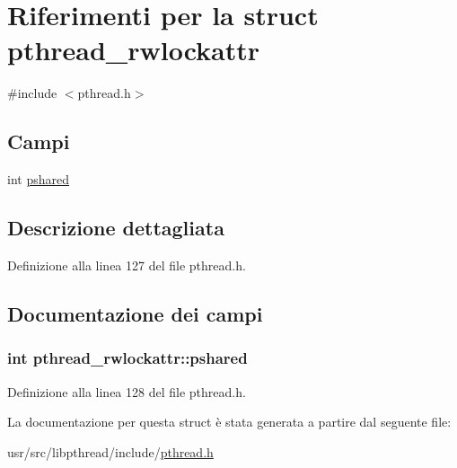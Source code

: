 \hypertarget{structpthread__rwlockattr}{\section{Riferimenti per la struct pthread\+\_\+rwlockattr}
\label{structpthread__rwlockattr}
}


{\ttfamily \#include $<$pthread.\+h$>$}

\subsection*{Campi}
\begin{DoxyCompactItemize}
\item 
int \hyperlink{structpthread__rwlockattr_a8a113eba0407c92f6302fada4c4d7419}{pshared}
\end{DoxyCompactItemize}


\subsection{Descrizione dettagliata}


Definizione alla linea 127 del file pthread.\+h.



\subsection{Documentazione dei campi}
\hypertarget{structpthread__rwlockattr_a8a113eba0407c92f6302fada4c4d7419}{
\subsubsection[{pshared}]{\setlength{\rightskip}{0pt plus 5cm}int pthread\+\_\+rwlockattr\+::pshared}}\label{structpthread__rwlockattr_a8a113eba0407c92f6302fada4c4d7419}


Definizione alla linea 128 del file pthread.\+h.



La documentazione per questa struct è stata generata a partire dal seguente file\+:\begin{DoxyCompactItemize}
\item 
usr/src/libpthread/include/\hyperlink{pthread_8h}{pthread.\+h}\end{DoxyCompactItemize}
